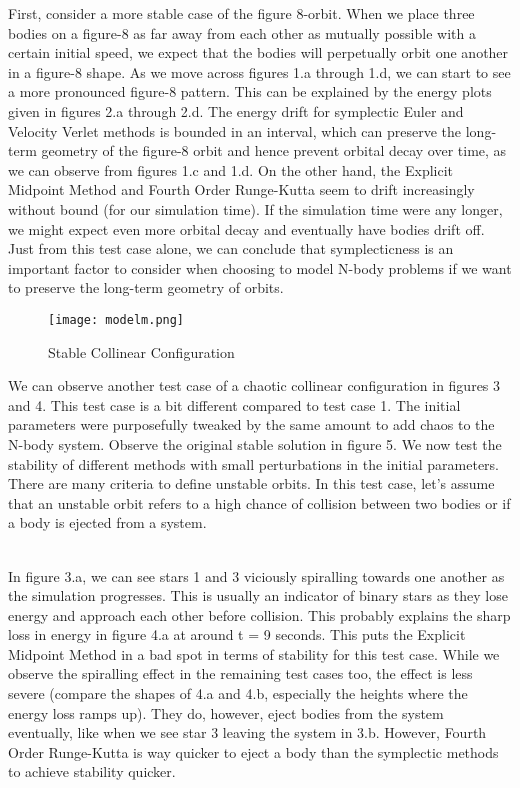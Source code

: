 \documentclass[a4paper,11pt]{article}
\begin{document}
First, consider a more stable case of the figure 8-orbit. When we place three bodies on a figure-8 as far away from each other as mutually possible with a certain initial speed, we expect that the bodies will perpetually orbit one another in a figure-8 shape. As we move across figures 1.a through 1.d, we can start to see a more pronounced figure-8 pattern. This can be explained by the energy plots given in figures 2.a through 2.d. The energy drift for symplectic Euler and Velocity Verlet methods is bounded in an interval, which can preserve the long-term geometry of the figure-8 orbit and hence prevent orbital decay over time, as we can observe from figures 1.c and 1.d. On the other hand, the Explicit Midpoint Method and Fourth Order Runge-Kutta seem to drift increasingly without bound (for our simulation time). If the simulation time were any longer, we might expect even more orbital decay and eventually have bodies drift off. Just from this test case alone, we can conclude that symplecticness is an important factor to consider when choosing to model N-body problems if we want to preserve the long-term geometry of orbits.

\noindent \begin{minipage}{0.375\textwidth}
    \begin{figure}[H]
    \texttt{[image: modelm.png]}
    \caption{Stable Collinear Configuration}
    \end{figure}
\end{minipage}
\begin{minipage}{0.625\textwidth}\raggedleft
We can observe another test case of a chaotic collinear configuration in figures 3 and 4. This test case is a bit different compared to test case 1. The initial parameters were purposefully tweaked by the same amount to add chaos to the N-body system. Observe the original stable solution in figure 5. We now test the stability of different methods with small perturbations in the initial parameters. There are many criteria to define unstable orbits. In this test case, let's assume that an unstable orbit refers to a high chance of collision between two bodies or if a body is ejected from a system.
\end{minipage} \\

In figure 3.a, we can see stars 1 and 3 viciously spiralling towards one another as the simulation progresses. This is usually an indicator of binary stars as they lose energy and approach each other before collision. This probably explains the sharp loss in energy in figure 4.a at around t = 9 seconds. This puts the Explicit Midpoint Method in a bad spot in terms of stability for this test case. While we observe the spiralling effect in the remaining test cases too, the effect is less severe (compare the shapes of 4.a and 4.b, especially the heights where the energy loss ramps up). They do, however, eject bodies from the system eventually, like when we see star 3 leaving the system in 3.b. However, Fourth Order Runge-Kutta is way quicker to eject a body than the symplectic methods to achieve stability quicker.
\end{document}
